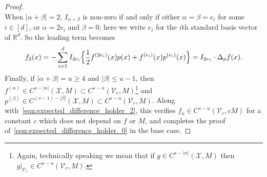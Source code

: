 \documentclass{article}
\newcommand{\Reals}{\mathbb{R}}
\newcommand{\abs}[1]{\left \lvert #1 \right \rvert}
\newcommand{\restr}[2]{\ensuremath{\left.#1\right|_{#2}}}
\newcommand{\1}{\mathbf{1}}
\newcommand{\Xset}{\mathcal{X}}
\newcommand{\Vset}{\mathcal{V}}
\theoremstyle{alden}
\theoremstyle{aldenthm}
\theoremstyle{definition}
\theoremstyle{remark}
\begin{document}
\begin{proof}
\begin{equation*}
	\end{equation*}
	When $\abs{\alpha + \beta} = 2$, $I_{\alpha + \beta}$ is non-zero if and only if either $\alpha = \beta = e_i$ for some $i \in [d]$, or $\alpha = 2e_i$ and $\beta = 0$; here we write $e_i$ for the $i$th standard basis vector of $\Reals^d$. So the leading term becomes
	\begin{equation*}
	f_2(x) = -\sum_{i = 1}^{d} I_{2e_i}\Bigl\{\frac{1}{2}f^{(2e_i)}(x)p(x) + f^{(e_i)}(x)p^{(e_i)}(x)\Bigr\} = I_{2e_1} \cdot \Delta_pf(x).
	\end{equation*}
	Finally, if $\abs{\alpha + \beta} = u \geq 4$ and $\abs{\beta} \leq u - 1$, then $f^{(\alpha)} \in C^{s - \abs{\alpha}}(\Xset,M) \subset C^{s- u}(\Vset_r,M)$\footnote{Again, technically speaking we mean that if $g \in C^{s - \abs{\alpha}}(\Xset,M)$ then $\restr{g}{\Vset_r} \in C^{s- u}(\Vset_r,M)$.} and  $p^{(\beta)} \in C^{(s - 1) - \abs{\beta}}(\Xset,M) \subset C^{s - u}(\Vset_r,M)$. Along with~\eqref{eqn:expected_difference_holder_2}, this verifies $f_u \in C^{s - u}(\Vset_r,cM)$ for a constant $c$ which does not depend on $f$ or $M$, and completes the proof of~\eqref{eqn:expected_difference_holder_0} in the base case.
	

\end{proof}
\end{document}
